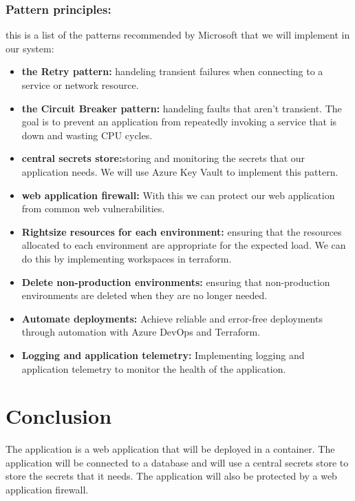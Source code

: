 \subsubsection*{Pattern principles:}
this is a list of the patterns recommended by Microsoft\cite{webArticle5} that we will implement in our system:
\begin{itemize}
    \item \textbf{the Retry pattern:} handeling transient failures when connecting to a service or network resource.
    \item \textbf{the Circuit Breaker pattern:} handeling faults that aren't transient. The goal is to prevent an application from repeatedly invoking a service that is down and wasting CPU cycles.
    \item \textbf{central secrets store:}storing and monitoring the secrets that our application needs. We will use Azure Key Vault to implement this pattern.
    \item \textbf{web application firewall:} With this we can protect our web application from common web vulnerabilities.
    \item \textbf{Rightsize resources for each environment:} ensuring that the resources allocated to each environment are appropriate for the expected load. We can do this by implementing workspaces in terraform.
    \item \textbf{Delete non-production environments:} ensuring that non-production environments are deleted when they are no longer needed.
    \item \textbf{Automate deployments:}  Achieve reliable and error-free deployments through automation with Azure DevOps and Terraform.
    \item \textbf{Logging and application telemetry:} Implementing logging and application telemetry to monitor the health of the application.
\end{itemize}

\section*{Conclusion}
The application is a web application that will be deployed in a container. The application will be connected to a database and will use a central secrets store to store the secrets that it needs. The application will also be protected by a web application firewall.